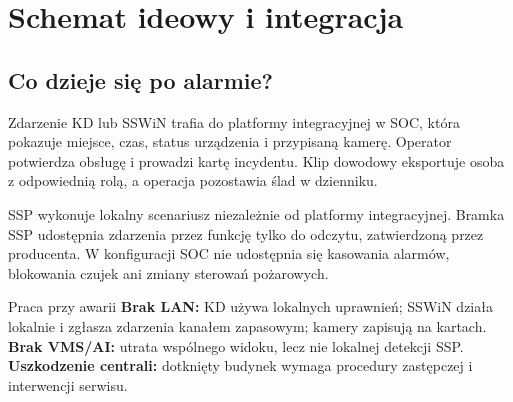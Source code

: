 \section{Schemat ideowy i integracja}
\subsection*{Co dzieje się po alarmie?}
Zdarzenie KD lub SSWiN trafia do platformy integracyjnej w SOC, która pokazuje miejsce, czas, status urządzenia i przypisaną kamerę. Operator potwierdza obsługę i prowadzi kartę incydentu. Klip dowodowy eksportuje osoba z odpowiednią rolą, a operacja pozostawia ślad w dzienniku.

SSP wykonuje lokalny scenariusz niezależnie od platformy integracyjnej. Bramka SSP udostępnia zdarzenia przez funkcję tylko do odczytu, zatwierdzoną przez producenta. W konfiguracji SOC nie udostępnia się kasowania alarmów, blokowania czujek ani zmiany sterowań pożarowych.

\begin{note}{Praca przy awarii}
\textbf{Brak LAN:} KD używa lokalnych uprawnień; SSWiN działa lokalnie i zgłasza zdarzenia kanałem zapasowym; kamery zapisują na kartach. \textbf{Brak VMS/AI:} utrata wspólnego widoku, lecz nie lokalnej detekcji SSP. \textbf{Uszkodzenie centrali:} dotknięty budynek wymaga procedury zastępczej i interwencji serwisu.
\end{note}
